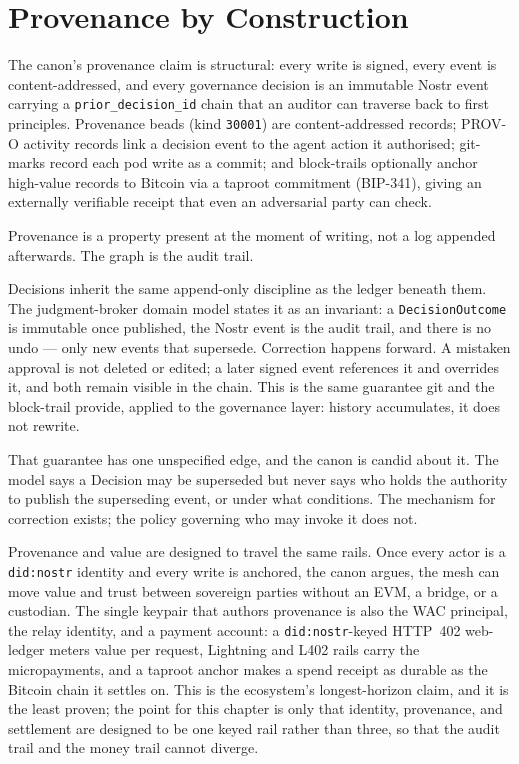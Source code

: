 \section{Provenance by Construction}

The canon's provenance claim is structural: every write is signed, every event is content-addressed, and every governance decision is an immutable Nostr event carrying a \texttt{prior\_decision\_id} chain that an auditor can traverse back to first principles. Provenance beads (kind \texttt{30001}) are content-addressed records; PROV-O activity records link a decision event to the agent action it authorised; git-marks record each pod write as a commit; and block-trails optionally anchor high-value records to Bitcoin via a taproot commitment (BIP-341), giving an externally verifiable receipt that even an adversarial party can check.

Provenance is a property present at the moment of writing, not a log appended afterwards. The graph is the audit trail.

Decisions inherit the same append-only discipline as the ledger beneath them. The judgment-broker domain model states it as an invariant: a \texttt{DecisionOutcome} is immutable once published, the Nostr event is the audit trail, and there is no undo --- only new events that supersede. Correction happens forward. A mistaken approval is not deleted or edited; a later signed event references it and overrides it, and both remain visible in the chain. This is the same guarantee git and the block-trail provide, applied to the governance layer: history accumulates, it does not rewrite.

That guarantee has one unspecified edge, and the canon is candid about it. The model says a Decision may be superseded but never says who holds the authority to publish the superseding event, or under what conditions. The mechanism for correction exists; the policy governing who may invoke it does not.

Provenance and value are designed to travel the same rails. Once every actor is a \texttt{did:nostr} identity and every write is anchored, the canon argues, the mesh can move value and trust between sovereign parties without an EVM, a bridge, or a custodian. The single keypair that authors provenance is also the WAC principal, the relay identity, and a payment account: a \texttt{did:nostr}-keyed HTTP~402 web-ledger meters value per request, Lightning and L402 rails carry the micropayments, and a taproot anchor makes a spend receipt as durable as the Bitcoin chain it settles on. This is the ecosystem's longest-horizon claim, and it is the least proven; the point for this chapter is only that identity, provenance, and settlement are designed to be one keyed rail rather than three, so that the audit trail and the money trail cannot diverge.

